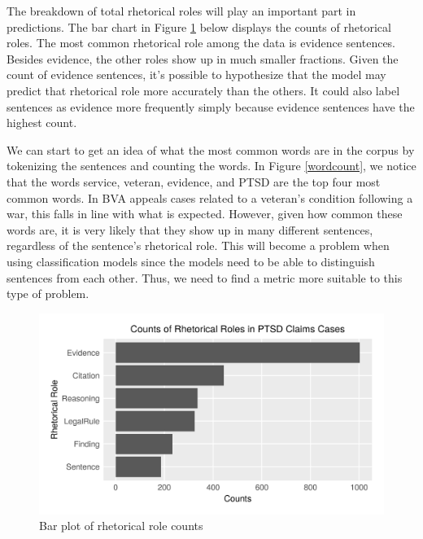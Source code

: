 \documentclass[11pt]{article}
\begin{document}
The breakdown of total rhetorical roles will play an important part in predictions. The bar chart in Figure \ref{rrcount} below displays the counts of rhetorical roles. The most common rhetorical role among the data is evidence sentences. Besides evidence, the other roles show up in much smaller fractions. Given the count of evidence sentences, it's possible to hypothesize that the model may predict that rhetorical role more accurately than the others. It could also label sentences as evidence more frequently simply because evidence sentences have the highest count.


We can start to get an idea of what the most common words are in the corpus by tokenizing the sentences and counting the words. In Figure \ref{wordcount}, we notice that the words service, veteran, evidence, and PTSD are the top four most common words. In BVA appeals cases related to a veteran's condition following a war, this falls in line with what is expected. However, given how common these words are, it is very likely that they show up in many different sentences, regardless of the sentence's rhetorical role. This will become a problem when using classification models since the models need to be able to distinguish sentences from each other. Thus, we need to find a metric more suitable to this type of problem.

\begin{figure}[h]
  \centering
  \includegraphics[scale=0.7]{images/barchart}
  \caption{Bar plot of rhetorical role counts}
  \label{rrcount}
\end{figure}
\end{document}
